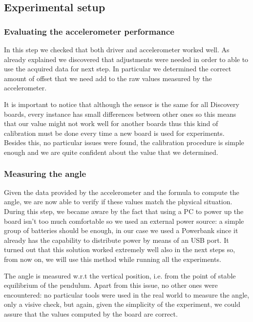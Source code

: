 \subsection{Experimental setup}
\subsubsection{Evaluating the accelerometer performance}
In this step we checked that both driver and accelerometer worked well. As already explained we discovered that adjustments were needed in order to able to use the acquired data for next step. In particular we determined the correct amount of offset that we need add to the raw values measured by the accelerometer. \par It is important to notice that although the sensor is the same for all Discovery boards, every instance has small differences between other ones so this means that our value might not work well for another boards thus this kind of calibration must be done every time a new board is used for experiments. \\ Besides this, no particular issues were found, the calibration procedure is simple enough and we are quite confident about the value that we determined.
\subsubsection{Measuring the angle}
Given the data provided by the accelerometer and the formula to compute the angle, we are now able to verify if these values match the physical situation. During this step, we became aware by the fact that using a PC to power up the board isn't too much comfortable so we used an external power source: a simple group of batteries should be enough, in our case we used a Powerbank since it already has the capability to distribute power by means of an USB port. It turned out that this solution worked extremely well also in the next steps so, from now on, we will use this method while running all the experiments. \par The angle is measured w.r.t the vertical position, i.e. from the point of stable equilibrium of the pendulum. Apart from this issue, no other ones were encountered: no particular tools were used in the real world to measure the angle, only a visive check, but again, given the simplicity of the experiment, we could assure that the values computed by the board are correct. 
